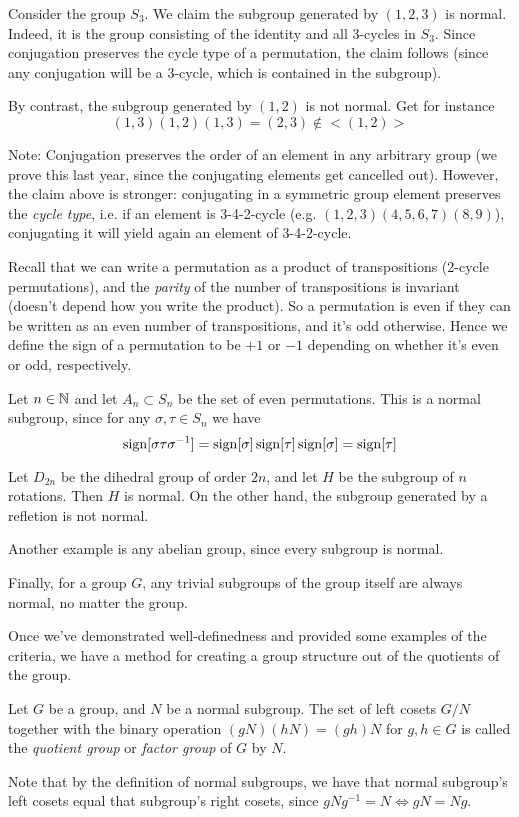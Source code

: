 \begin{example}
  Consider the group $S_3$. We claim the subgroup generated by $(1,2,3)$ is normal.
  Indeed, it is the group consisting of the identity and all 3-cycles in $S_3$. Since
  conjugation preserves the cycle type of a permutation, the claim follows (since any
  conjugation will be a 3-cycle, which is contained in the subgroup).

  By contrast, the subgroup generated by $(1,2)$ is not normal. Get for instance
  \[(1,3)(1,2)(1,3)=(2,3)\not\in<(1,2)>\]

\end{example}

Note: Conjugation preserves the order of an element in any arbitrary group (we prove this
last year, since the conjugating elements get cancelled out). However, the claim above is
stronger: conjugating in a symmetric group element preserves the \emph{cycle type}, i.e.
if an element is 3-4-2-cycle (e.g. $(1,2,3)(4,5,6,7)(8,9)$), conjugating it will yield
again an element of 3-4-2-cycle.

\begin{example}
  Recall that we can write a permutation as a product of transpositions (2-cycle
  permutations), and the \emph{parity} of the number of transpositions is invariant
  (doesn't depend how you write the product). So a permutation is even if they can be
  written as an even number of transpositions, and it's odd otherwise. Hence we define the
  sign of a permutation to be $+1$ or $-1$ depending on whether it's even or odd,
  respectively.

  Let $n\in\mathbb N$ and let $A_n\subset S_n$ be the set of even permutations. This is a normal
  subgroup, since for any $\sigma, \tau\in S_n$ we have
  \[\operatorname{sign} [\sigma \tau \sigma^{-1}] =
  \operatorname{sign}[\sigma]\operatorname{sign}[\tau]\operatorname{sign}[\sigma]=\operatorname{sign}[\tau]\]
\end{example}

\begin{example}
  Let $D_{2n}$ be the dihedral group of order $2n$, and let $H$ be the subgroup of $n$
  rotations. Then $H$ is normal. On the other hand, the subgroup generated by a refletion
  is not normal.

  Another example is any abelian group, since every subgroup is normal.

  Finally, for a group $G$, any trivial subgroups of the group itself are always normal,
  no matter the group.
\end{example}

Once we've demonstrated well-definedness and provided some examples of the criteria, we
have a method for creating a group structure out of the quotients of the group. 

\begin{definition}
  Let $G$ be a group, and $N$ be a normal subgroup. The set of left cosets $G/N$ together
  with the binary operation $(gN)(hN)=(gh)N$ for $g,h\in G$ is called the \emph{quotient
  group} or \emph{factor group} of $G$ by $N$.
  \label{quotientGroup}
\end{definition}
Note that by the definition of normal subgroups, we have that normal subgroup's left
cosets equal that subgroup's right cosets, since $gNg^{-1}=N\iff gN=Ng$.

